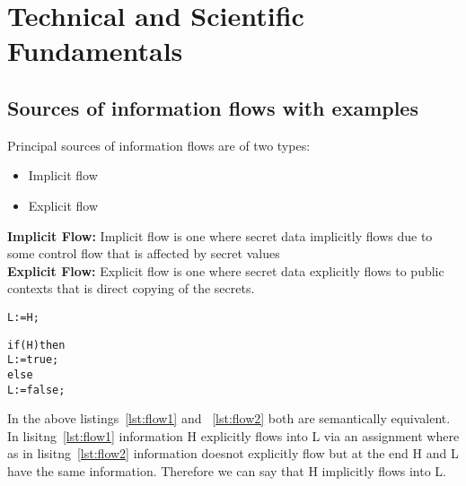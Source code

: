 \chapter{Technical and Scientific Fundamentals}
\label{chapter:Technical}

\section{Sources of information flows with examples}
Principal sources of information flows are of two types:~\cite{King:2008}
~\cite{book:analysis}
\begin{itemize}
 \item Implicit flow
 \item Explicit flow
\end{itemize}
\textbf{Implicit Flow:}
Implicit flow is one where secret data implicitly flows due
to some control flow that is affected by secret values\\
\textbf{Explicit Flow:}
Explicit flow is one where secret data explicitly flows to
public contexts that is direct copying of the secrets.\\

\begin{lstlisting}[caption={Explicit Information Flow},label={lst:flow1}]
L:=H;
\end{lstlisting}

\begin{lstlisting}[caption={Implicit Information Flow},label={lst:flow2}]
if(H)then
L:=true;
else
L:=false;
\end{lstlisting}

In the above listings~\ref{lst:flow1} and ~\ref{lst:flow2} both are 
semantically equivalent. In lisitng~\ref{lst:flow1} information H explicitly
flows into L via an assignment where as in lisitng~\ref{lst:flow2} information
doesnot explicitly flow but at the end H and L have the same information.
Therefore we can say that H implicitly flows into L.

